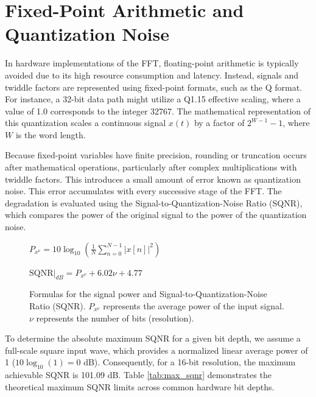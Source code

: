\section{Fixed-Point Arithmetic and Quantization Noise}
In hardware implementations of the FFT, floating-point arithmetic is typically avoided due to its high resource consumption and latency. Instead, signals and twiddle factors are represented using fixed-point formats, such as the Q format. For instance, a 32-bit data path might utilize a Q1.15 effective scaling, where a value of 1.0 corresponds to the integer 32767. The mathematical representation of this quantization scales a continuous signal $x(t)$ by a factor of $2^{W-1}-1$, where $W$ is the word length.  

Because fixed-point variables have finite precision, rounding or truncation occurs after mathematical operations, particularly after complex multiplications with twiddle factors. This introduces a small amount of error known as quantization noise. This error accumulates with every successive stage of the FFT.
The degradation is evaluated using the Signal-to-Quantization-Noise Ratio (SQNR), which compares the power of the original signal to the power of the quantization noise.

\begin{figure}[htbp]
    \centering
    \vspace{1em}
    
    $\displaystyle P_{x^\nu} = 10\log_{10} \left( \frac{1}{N} \sum_{n=0}^{N-1} |x[n]|^2 \right)$
    
    \vspace{1.5em}
    
    $\displaystyle \text{SQNR}|_{dB} = P_{x^\nu} + 6.02\nu + 4.77$
    
    \vspace{1em}
    \caption{Formulas for the signal power and Signal-to-Quantization-Noise Ratio (SQNR). $P_{x^\nu}$ represents the average power of the input signal. $\nu$ represents the number of bits (resolution).}
    \label{fig:sqnr_and_power}
\end{figure}

To determine the absolute maximum SQNR for a given bit depth, we assume a full-scale square input wave, which provides a normalized linear average power of 1 ($10\log_{10}(1) = 0$ dB). Consequently, for a 16-bit resolution, the maximum achievable SQNR is 101.09 dB. Table \ref{tab:max_sqnr} demonstrates the theoretical maximum SQNR limits across common hardware bit depths.

